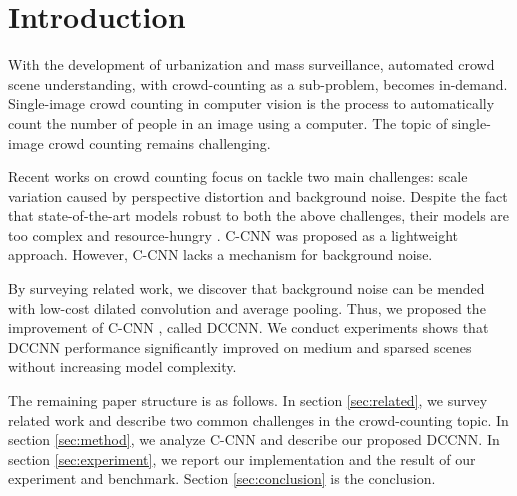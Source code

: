 \section{Introduction}







With the development of urbanization and mass surveillance, automated crowd scene understanding, with crowd-counting as a sub-problem, becomes in-demand. Single-image crowd counting in computer vision is the process to automatically count the number of people in an image using a computer.  The topic of single-image crowd counting remains challenging.

Recent works on crowd counting focus on tackle two main challenges: scale variation caused by perspective distortion and background noise. Despite the fact that state-of-the-art models robust to both the above challenges, their models are too complex and resource-hungry \cite{liu2019context, jiang2019crowd, liu2019adcrowdnet, amirgholipour2020pdanet}. C-CNN \cite{9053780} was proposed as a lightweight approach. However, C-CNN lacks a mechanism for background noise. 


By surveying related work, we discover that background noise can be mended with low-cost dilated convolution and average pooling. Thus, we proposed the improvement of C-CNN \cite{9053780}, called DCCNN. We conduct experiments shows that DCCNN performance significantly improved on medium and sparsed scenes without increasing model complexity.

The remaining paper structure is as follows. In section \ref{sec:related}, we survey related work and describe two common challenges in the crowd-counting topic. In section \ref{sec:method}, we analyze C-CNN and describe our proposed DCCNN. In section \ref{sec:experiment}, we report our implementation and the result of our experiment and benchmark. Section \ref{sec:conclusion} is the conclusion.
